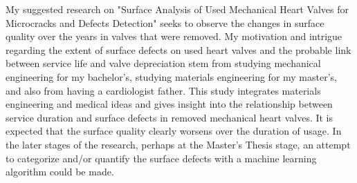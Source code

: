My suggested research on "Surface Analysis of Used Mechanical Heart Valves for Microcracks and Defects Detection" seeks to observe the changes in surface quality over the years in valves that were removed. My motivation and intrigue regarding the extent of surface defects on used heart valves and the probable link between service life and valve depreciation stem from studying mechanical engineering for my bachelor's, studying materials engineering for my master's, and also from having a cardiologist father. This study integrates materials engineering and medical ideas and gives insight into the relationship between service duration and surface defects in removed mechanical heart valves. It is expected that the surface quality clearly worsens over the duration of usage. In the later stages of the research, perhaps at the Master’s Thesis stage, an attempt to categorize and/or quantify the surface defects with a machine learning algorithm could be made.




